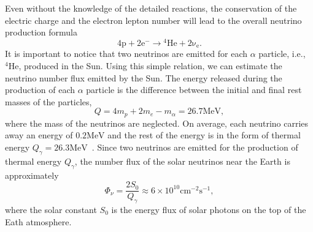 Even without the knowledge of the detailed reactions, the conservation of the electric charge and the electron lepton number will lead to the overall neutrino production formula
\begin{equation}
\mathrm{4p+2e^- \to {}^4He + 2\nu_e }.
\end{equation}
It is important to notice that two neutrinos are emitted for each $\alpha$ particle, i.e., ${}^4\mathrm{He}$, produced in the Sun. Using this simple relation, we can estimate the neutrino number flux emitted by the Sun. The energy released during the production of each $\alpha$ particle is the difference between the initial and final rest masses of the particles,
\begin{equation}
Q=4m_p+2m_e-m_{\alpha}=26.7\mathrm{MeV},
\end{equation}
where the mass of the neutrinos are neglected. On average, each neutrino carries away an energy of $0.2\mathrm{MeV}$ and the rest of the energy is in the form of thermal energy $Q_\gamma=26.3\mathrm{MeV}$~\cite{Adelberger2011a}. %
Since two neutrinos are emitted for the production of thermal energy $Q_\gamma$, the number flux of the solar neutrinos near the Earth is approximately
\begin{equation}
\Phi_\nu = \frac{2 S_0}{Q_\gamma} \approx 6\times 10^{10} \mathrm{cm^{-2}s^{-1}},
\end{equation}
where the solar constant $S_0$ is the energy flux of solar photons on the top of the Eath atmosphere.



